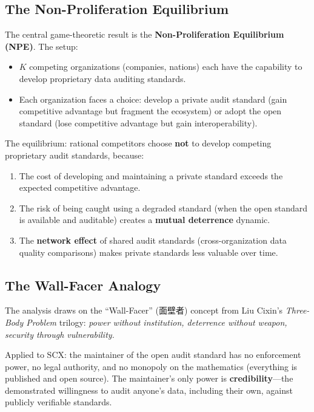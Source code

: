 \documentclass[12pt,a4paper]{ctexart}
\begin{document}
\subsection{The Non-Proliferation Equilibrium}

The central game-theoretic result is the \textbf{Non-Proliferation Equilibrium (NPE)}. The setup:
\begin{itemize}
\item $K$ competing organizations (companies, nations) each have the capability to develop proprietary data auditing standards.
\item Each organization faces a choice: develop a private audit standard (gain competitive advantage but fragment the ecosystem) or adopt the open standard (lose competitive advantage but gain interoperability).
\end{itemize}

The equilibrium: rational competitors choose \textbf{not} to develop competing proprietary audit standards, because:
\begin{enumerate}
\item The cost of developing and maintaining a private standard exceeds the expected competitive advantage.
\item The risk of being caught using a degraded standard (when the open standard is available and auditable) creates a \textbf{mutual deterrence} dynamic.
\item The \textbf{network effect} of shared audit standards (cross-organization data quality comparisons) makes private standards less valuable over time.
\end{enumerate}

\subsection{The Wall-Facer Analogy}

The analysis draws on the ``Wall-Facer'' (面壁者) concept from Liu Cixin's \textit{Three-Body Problem} trilogy: \textit{power without institution, deterrence without weapon, security through vulnerability.}

Applied to SCX: the maintainer of the open audit standard has no enforcement power, no legal authority, and no monopoly on the mathematics (everything is published and open source). The maintainer's only power is \textbf{credibility}—the demonstrated willingness to audit anyone's data, including their own, against publicly verifiable standards.
\end{document}
